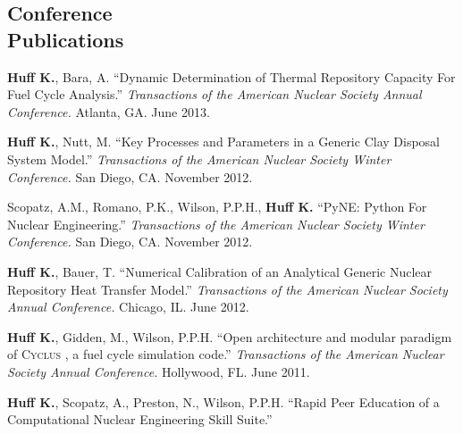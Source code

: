 \documentclass[margin,line]{resume}
\newcommand{\Cyclus}{\textsc{Cyclus }}
\begin{document}
\begin{resume}
    \section{\mysidestyle Conference\\Publications}
    \begin{bibenum}
      \item \textbf{Huff K.}, Bara, A. ``Dynamic Determination of Thermal Repository Capacity For Fuel Cycle Analysis.''
         \emph{Transactions of the American Nuclear Society Annual Conference.} 
         Atlanta, GA. June 2013.
      \item \textbf{Huff K.}, Nutt, M. ``Key Processes and Parameters in a Generic Clay Disposal System Model.''
         \emph{Transactions of the American Nuclear Society Winter Conference.} 
        San Diego, CA. November 2012.
      \item Scopatz, A.M., Romano, P.K., Wilson, P.P.H., \textbf{Huff K.} ``PyNE: Python For Nuclear Engineering.''
         \emph{Transactions of the American Nuclear Society Winter Conference.} 
        San Diego, CA. November 2012. 
      \item \textbf{Huff K.}, Bauer, T. ``Numerical Calibration of an Analytical Generic Nuclear Repository Heat Transfer Model.''
         \emph{Transactions of the American Nuclear Society Annual Conference.} 
        Chicago, IL. June 2012.
      \item \textbf{Huff K.}, Gidden, M., Wilson, P.P.H. ``Open architecture and modular paradigm of \Cyclus, a fuel cycle simulation code.''
         \emph{Transactions of the American Nuclear Society Annual Conference.} 
        Hollywood, FL. June 2011.
      \item \textbf{Huff K.}, Scopatz, A., Preston, N., Wilson, P.P.H. ``Rapid Peer Education of a Computational Nuclear Engineering Skill Suite.'' 

\end{bibenum}
\end{resume}
\end{document}
